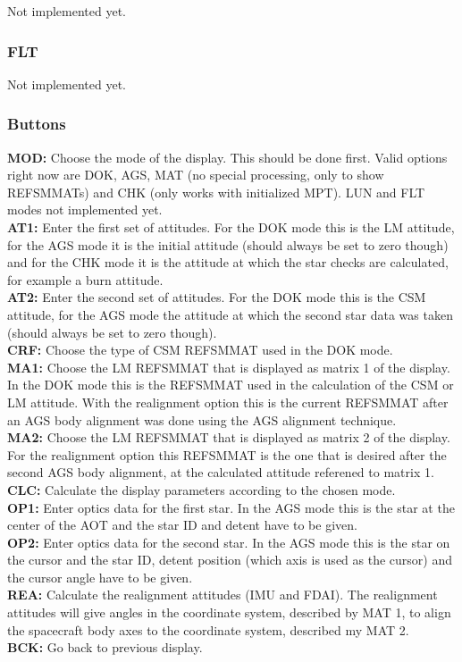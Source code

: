 \documentclass[11pt]{article} %
\begin{document}
Not implemented yet.\\

\subsubsection{FLT}

Not implemented yet.\\

\subsubsection{Buttons}

\textbf{MOD:} Choose the mode of the display. This should be done first. Valid options right now are DOK, AGS, MAT (no special processing, only to show REFSMMATs) and CHK (only works with initialized MPT). LUN and FLT modes not implemented yet.\\
\textbf{AT1:} Enter the first set of attitudes. For the DOK mode this is the LM attitude, for the AGS mode it is the initial attitude (should always be set to zero though) and for the CHK mode it is the attitude at which the star checks are calculated, for example a burn attitude.\\
\textbf{AT2:} Enter the second set of attitudes. For the DOK mode this is the CSM attitude, for the AGS mode the attitude at which the second star data was taken (should always be set to zero though).\\
\textbf{CRF:} Choose the type of CSM REFSMMAT used in the DOK mode.\\
\textbf{MA1:} Choose the LM REFSMMAT that is displayed as matrix 1 of the display. In the DOK mode this is the REFSMMAT used in the calculation of the CSM or LM attitude. With the realignment option this is the current REFSMMAT after an AGS body alignment was done using the AGS alignment technique.\\ 
\textbf{MA2:} Choose the LM REFSMMAT that is displayed as matrix 2 of the display. For the realignment option this REFSMMAT is the one that is desired after the second AGS body alignment, at the calculated attitude referened to matrix 1.\\

\textbf{CLC:} Calculate the display parameters according to the chosen mode.\\
\textbf{OP1:} Enter optics data for the first star. In the AGS mode this is the star at the center of the AOT and the star ID and detent have to be given.\\
\textbf{OP2:} Enter optics data for the second star. In the AGS mode this is the star on the cursor and the star ID, detent position (which axis is used as the cursor) and the cursor angle have to be given.\\
\textbf{REA:} Calculate the realignment attitudes (IMU and FDAI). The realignment attitudes will give angles in the coordinate system, described by MAT 1, to align the spacecraft body axes to the coordinate system, described my MAT 2.\\
\textbf{BCK:} Go back to previous display.\\
\newpage
\end{document}
